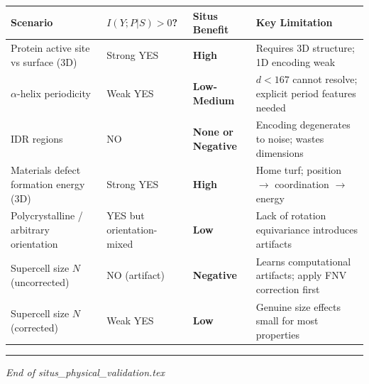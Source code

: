 \documentclass[
  12pt,
]{article}
\begin{document}
\begin{longtable}[]{@{}
  >{\raggedright\arraybackslash}p{}
  >{\raggedright\arraybackslash}p{}
  >{\raggedright\arraybackslash}p{}
  >{\raggedright\arraybackslash}p{}@{}}
\toprule\noalign{}
\begin{minipage}[b]{\linewidth}\raggedright
Scenario
\end{minipage} & \begin{minipage}[b]{\linewidth}\raggedright
$I(Y;P|S) > 0$?
\end{minipage} & \begin{minipage}[b]{\linewidth}\raggedright
Situs Benefit
\end{minipage} & \begin{minipage}[b]{\linewidth}\raggedright
Key Limitation
\end{minipage} \\
\midrule\noalign{}
\endhead
\bottomrule\noalign{}
\endlastfoot
Protein active site vs surface (3D) & Strong YES & \textbf{High} & Requires 3D structure; 1D encoding weak \\
$\alpha$-helix periodicity & Weak YES & \textbf{Low-Medium} & $d < 167$ cannot resolve; explicit period features needed \\
IDR regions & NO & \textbf{None or Negative} & Encoding degenerates to noise; wastes dimensions \\
Materials defect formation energy (3D) & Strong YES & \textbf{High} & Home turf; position $\to$ coordination $\to$ energy \\
Polycrystalline / arbitrary orientation & YES but orientation-mixed & \textbf{Low} & Lack of rotation equivariance introduces artifacts \\
Supercell size $N$ (uncorrected) & NO (artifact) & \textbf{Negative} & Learns computational artifacts; apply FNV correction first \\
Supercell size $N$ (corrected) & Weak YES & \textbf{Low} & Genuine size effects small for most properties \\
\end{longtable}

\begin{center}\rule{0.5\linewidth}{0.5pt}\end{center}

\emph{End of situs\_physical\_validation.tex}
\end{document}
